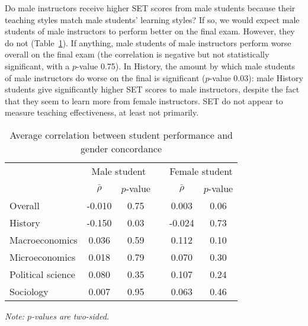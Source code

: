 \documentclass[12pt]{article}
\begin{document}
Do male instructors receive higher SET scores from male students because their 
teaching styles match male students' learning styles? 
If so, we would expect male students of male instructors to perform better on the final exam. 
However, they do not (Table~\ref{tab:finalconcordance}). 
If anything, male students of male instructors perform worse overall on the final 
exam (the correlation is negative but not statistically significant, with a $p$-value 0.75). 
In History, the amount by which male students of male instructors do worse on the final
is significant ($p$-value 0.03):
male History students give significantly higher SET scores to male instructors, 
despite the fact that they seem to learn more from female instructors. 
SET do not appear to measure teaching effectiveness, at least not primarily.

\begin{table}[htbp]
  \centering
  \footnotesize 
  \caption{Average correlation between student performance and gender concordance}
    \begin{tabular}{lccccc}
    \toprule 
          & \multicolumn{2}{c}{Male student}  &  & \multicolumn{2}{c}{Female student} \\
      & $\bar{\rho}$  &  $p$-value &  & $\bar{\rho}$  &  $p$-value    \\
                             \midrule
      \quad  Overall &                 -0.010       & 0.75 & &  0.003       & 0.06  \\
      \quad  History &                 -0.150       & 0.03 & &  -0.024       & 0.73   \\
      \quad  Macroeconomics &     0.036      & 0.59 & & 0.112       & 0.10   \\
      \quad  Microeconomics &      0.018       & 0.79 & &  0.070       & 0.30  \\
      \quad  Political science &      0.080       & 0.35 & &  0.107       & 0.24  \\
      \quad  Sociology &               0.007       & 0.95 & & 0.063       & 0.46  \\
    \bottomrule
    \end{tabular}%
 \label{tab:finalconcordance}%
  
  \textit{Note: $p$-values are two-sided.}
\end{table}%
\normalsize
\end{document}
